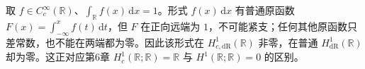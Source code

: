 取 \(f\in C_c^\infty(\mathbb R)\)、\(\int_{\mathbb R}f(x)\,\mathrm dx=1\)。形式 \(f(x)\,\mathrm dx\) 有普通原函数 \(F(x)=\int_{-\infty}^x f(t)\,\mathrm dt\)，但 \(F\) 在正向远端为 \(1\)，不可能紧支；任何其他原函数只差常数，也不能在两端都为零。因此该形式在 \(H_{c,\mathrm{dR}}^1(\mathbb R)\) 非零，在普通 \(H_{\mathrm{dR}}^1(\mathbb R)\) 却为零。这正对应第6章 \(H_c^1(\mathbb R;\mathbb R)=\mathbb R\) 与 \(H^1(\mathbb R;\mathbb R)=0\) 的区别。
